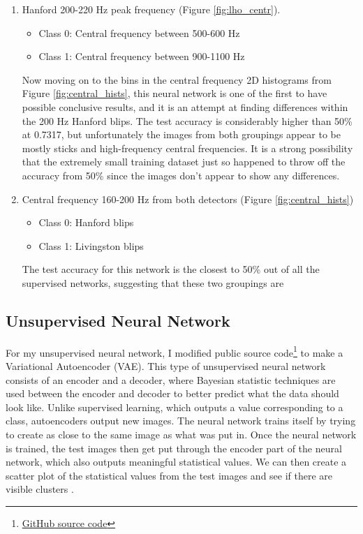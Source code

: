 \documentclass[a4paper]{article}
\begin{document}
\begin{enumerate}
	\item Hanford 200-220 Hz peak frequency (Figure \ref{fig:lho_centr}). 
	\begin{itemize}
		\item Class 0: Central frequency between 500-600 Hz
		\item Class 1: Central frequency between 900-1100 Hz
	\end{itemize} Now moving on to the bins in the central frequency 2D histograms from Figure \ref{fig:central_hists}, this neural network is one of the first to have possible conclusive results, and it is an attempt at finding differences within the 200 Hz Hanford blips. The test accuracy is considerably higher than 50\% at 0.7317, but unfortunately the images from both groupings appear to be mostly sticks and high-frequency central frequencies. It is a strong possibility that the extremely small training dataset just so happened to throw off the accuracy from 50\% since the images don't appear to show any differences. 
	
	\item Central frequency 160-200 Hz from both detectors (Figure \ref{fig:central_hists})
	\begin{itemize}
		\item Class 0: Hanford blips
		\item Class 1: Livingston blips
	\end{itemize} The test accuracy for this network is the closest to 50\% out of all the supervised networks, suggesting that these two groupings are 
	
\end{enumerate}

\subsection{Unsupervised Neural Network}

For my unsupervised neural network, I modified public source code\footnote{\href{https://github.com/keras-team/keras/blob/master/examples/variational_autoencoder.py}{GitHub source code}} to make a Variational Autoencoder (VAE). This type of unsupervised neural network consists of an encoder and a decoder, where Bayesian statistic techniques are used between the encoder and decoder to better predict what the data should look like. Unlike supervised learning, which outputs a value corresponding to a class, autoencoders output new images. The neural network trains itself by trying to create as close to the same image as what was put in. Once the neural network is trained, the test images then get put through the encoder part of the neural network, which also outputs meaningful statistical values. We can then create a scatter plot of the statistical values from the test images and see if there are visible clusters \cite{Kingma:2013}. 
\end{document}
